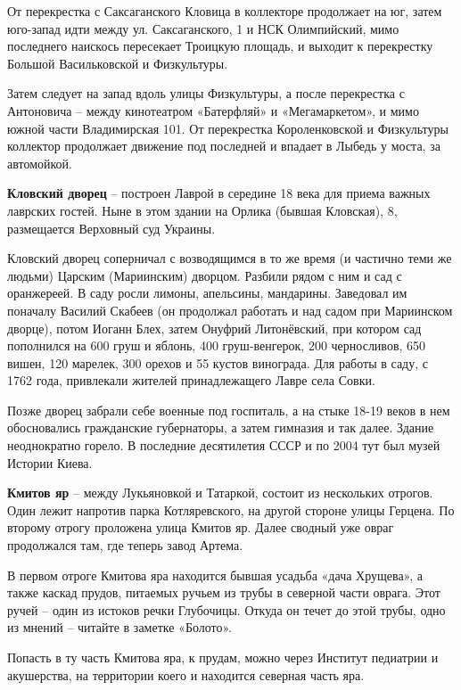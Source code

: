 От перекрестка с Саксаганского Кловица в коллекторе продолжает на юг, затем юго-запад идти между ул. Саксаганского, 1 и НСК Олимпийский, мимо последнего наискось пересекает Троицкую площадь, и выходит к перекрестку Большой Васильковской и Физкультуры.

Затем следует на запад вдоль улицы Физкультуры, а после перекрестка с Антоновича – между кинотеатром «Батерфляй» и «Мегамаркетом», и мимо южной части Владимирская 101. От перекрестка Короленковской и Физкультуры коллектор продолжает движение под последней и впадает в Лыбедь у моста, за автомойкой.\\ 

\medskip


\textbf{Кловский дворец} – построен Лаврой в середине 18 века для приема важных лаврских гостей. Ныне в этом здании на Орлика (бывшая Кловская), 8, размещается Верховный суд Украины. 

Кловский дворец соперничал с возводящимся в то же время (и частично теми же людьми) Царским (Мариинским) дворцом. Разбили рядом с ним и сад с оранжереей. В саду росли лимоны, апельсины, мандарины. Заведовал им поначалу Василий Скабеев (он продолжал работать и над садом при Мариинском дворце), потом Иоганн Блех, затем Онуфрий Литонёвский, при котором сад пополнился на 600 груш и яблонь, 400 груш-венгерок, 200 черносливов, 650 вишен, 120 марелек, 300 орехов и 55 кустов винограда. Для работы в саду, с 1762 года, привлекали жителей принадлежащего Лавре села Совки.

Позже дворец забрали себе военные под госпиталь, а на стыке 18-19 веков в нем обосновались гражданские губернаторы, а затем гимназия и так далее. Здание неоднократно горело. В последние десятилетия СССР и по 2004 тут был музей Истории Киева.\\

\medskip

\textbf{Кмитов яр} – между Лукьяновкой и Татаркой, состоит из нескольких отрогов. Один 
лежит напротив парка Котляревского, на другой стороне улицы Герцена. По второму отрогу проложена улица Кмитов яр. Далее сводный уже овраг продолжался там, где теперь завод Артема.

В первом отроге Кмитова яра находится бывшая усадьба «дача Хрущева», а также каскад прудов, питаемых ручьем из трубы в северной части оврага. Этот ручей – один из истоков речки Глубочицы. Откуда он течет до этой трубы, одно из мнений – читайте в заметке «Болото». 

Попасть в ту часть Кмитова яра, к прудам, можно через Институт педиатрии и акушерства, на территории коего и находится северная часть яра.

